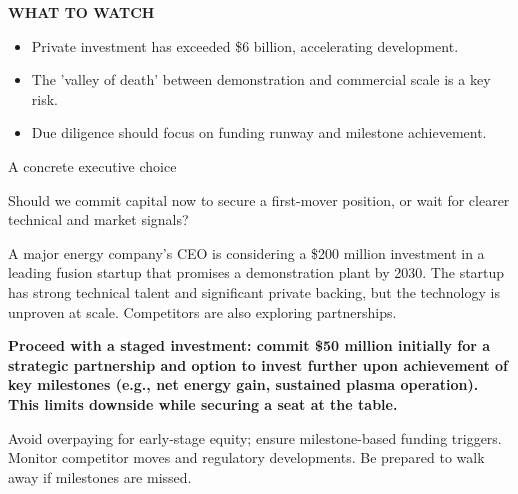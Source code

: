 \documentclass[10pt,a4paper]{article}
\begin{document}
\vspace{4pt}\noindent\begin{minipage}{\linewidth}
{\textcolor{BOGreen}{\scriptsize\bfseries WHAT TO WATCH}}\par\vspace{2pt}
{\footnotesize\begin{itemize}
\item Private investment has exceeded \$6 billion, accelerating development.
\item The 'valley of death' between demonstration and commercial scale is a key risk.
\item Due diligence should focus on funding runway and milestone achievement.
\end{itemize}}
\end{minipage}
\label{chap:2:end}

\clearpage
{\sffamily\fontsize{22}{27}\selectfont\color{BONavy} A concrete executive choice}\par\vspace{10pt}
\begin{minipage}[t]{0.43\linewidth}
{\sffamily\fontsize{17}{22}\selectfont\color{BOGreen} Should we commit capital now to secure a first-mover position, or wait for clearer technical and market signals?}\par
\end{minipage}\hfill\begin{minipage}[t]{0.50\linewidth}
{\small A major energy company's CEO is considering a \$200 million investment in a leading fusion startup that promises a demonstration plant by 2030. The startup has strong technical talent and significant private backing, but the technology is unproven at scale. Competitors are also exploring partnerships.}\par
{\small\bfseries\color{BOText} Proceed with a staged investment: commit \$50 million initially for a strategic partnership and option to invest further upon achievement of key milestones (e.g., net energy gain, sustained plasma operation). This limits downside while securing a seat at the table.}\par\vspace{5pt}
{\footnotesize\color{BOMuted} Avoid overpaying for early-stage equity; ensure milestone-based funding triggers. Monitor competitor moves and regulatory developments. Be prepared to walk away if milestones are missed.}\par\end{minipage}
\end{document}
